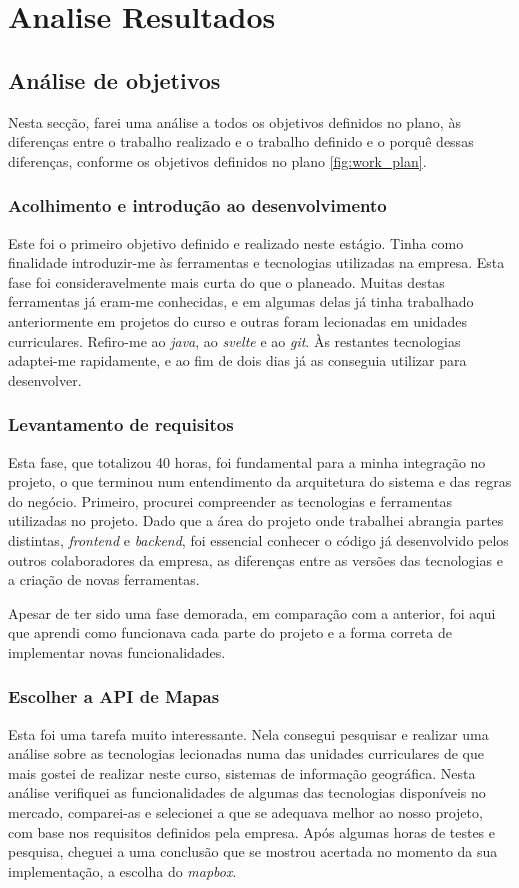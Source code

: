 \chapter{Analise Resultados}\label{chapter:analysis-result}
\section{Análise de objetivos}
Nesta secção, farei uma análise a todos os objetivos definidos no plano, às diferenças entre o trabalho realizado e o trabalho definido e o porquê dessas diferenças, conforme os objetivos definidos no plano \ref{fig:work_plan}.

\subsection{Acolhimento e introdução ao desenvolvimento}
Este foi o primeiro objetivo definido e realizado neste estágio. Tinha como finalidade introduzir-me às ferramentas e tecnologias utilizadas na empresa. Esta fase foi consideravelmente mais curta do que o planeado. Muitas destas ferramentas já eram-me conhecidas, e em algumas delas já tinha trabalhado anteriormente em projetos do curso e outras foram lecionadas em unidades curriculares. Refiro-me ao \textit{java}, ao \textit{svelte} e ao \textit{git}. Às restantes tecnologias adaptei-me rapidamente, e ao fim de dois dias já as conseguia utilizar para desenvolver.

\vspace{0.5cm}
\subsection{Levantamento de requisitos}
Esta fase, que totalizou 40 horas, foi fundamental para a minha integração no projeto, o que terminou num entendimento da arquitetura do sistema e das regras do negócio. Primeiro, procurei compreender as tecnologias e ferramentas utilizadas no projeto. Dado que a área do projeto onde trabalhei abrangia partes distintas, \textit{frontend} e \textit{backend}, foi essencial conhecer o código já desenvolvido pelos outros colaboradores da empresa, as diferenças entre as versões das tecnologias e a criação de novas ferramentas.

Apesar de ter sido uma fase demorada, em comparação com a anterior, foi aqui que aprendi como funcionava cada parte do projeto e a forma correta de implementar novas funcionalidades. 

\clearpage
\subsection{Escolher a API de Mapas}
Esta foi uma tarefa muito interessante. Nela consegui pesquisar e realizar uma análise sobre as tecnologias lecionadas numa das unidades curriculares de que mais gostei de realizar neste curso, sistemas de informação geográfica. Nesta análise verifiquei as funcionalidades de algumas das tecnologias disponíveis no mercado, comparei-as e selecionei a que se adequava melhor ao nosso projeto, com base nos requisitos definidos pela empresa. Após algumas horas de testes e pesquisa, cheguei a uma conclusão que se mostrou acertada no momento da sua implementação, a escolha do \textit{mapbox}.

